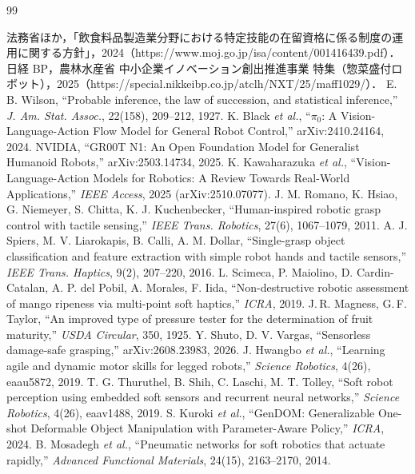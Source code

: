 \documentclass[a4paper,twocolumn,10pt]{ltjsarticle}
\begin{document}
\begin{thebibliography}{99}\raggedright\small
{} 法務省ほか，「飲食料品製造業分野における特定技能の在留資格に係る制度の運用に関する方針」，2024（https://www.moj.go.jp/isa/content/001416439.pdf）．
 日経 BP，農林水産省 中小企業イノベーション創出推進事業 特集（惣菜盛付ロボット），2025（https://special.nikkeibp.co.jp/atclh/NXT/25/maff1029/）．
 E. B. Wilson, ``Probable inference, the law of succession, and statistical inference,'' \textit{J. Am. Stat. Assoc.}, 22(158), 209--212, 1927.
 K. Black \textit{et al.}, ``$\pi_0$: A Vision-Language-Action Flow Model for General Robot Control,'' arXiv:2410.24164, 2024.
 NVIDIA, ``GR00T N1: An Open Foundation Model for Generalist Humanoid Robots,'' arXiv:2503.14734, 2025.
 K. Kawaharazuka \textit{et al.}, ``Vision-Language-Action Models for Robotics: A Review Towards Real-World Applications,'' \textit{IEEE Access}, 2025 (arXiv:2510.07077).
 J. M. Romano, K. Hsiao, G. Niemeyer, S. Chitta, K. J. Kuchenbecker, ``Human-inspired robotic grasp control with tactile sensing,'' \textit{IEEE Trans. Robotics}, 27(6), 1067--1079, 2011.
 A. J. Spiers, M. V. Liarokapis, B. Calli, A. M. Dollar, ``Single-grasp object classification and feature extraction with simple robot hands and tactile sensors,'' \textit{IEEE Trans. Haptics}, 9(2), 207--220, 2016.
 L. Scimeca, P. Maiolino, D. Cardin-Catalan, A. P. del Pobil, A. Morales, F. Iida, ``Non-destructive robotic assessment of mango ripeness via multi-point soft haptics,'' \textit{ICRA}, 2019.
 J.\,R. Magness, G.\,F. Taylor, ``An improved type of pressure tester for the determination of fruit maturity,'' \emph{USDA Circular}, 350, 1925.
 Y. Shuto, D. V. Vargas, ``Sensorless damage-safe grasping,'' arXiv:2608.23983, 2026.
 J. Hwangbo \textit{et al.}, ``Learning agile and dynamic motor skills for legged robots,'' \textit{Science Robotics}, 4(26), eaau5872, 2019.
 T. G. Thuruthel, B. Shih, C. Laschi, M. T. Tolley, ``Soft robot perception using embedded soft sensors and recurrent neural networks,'' \textit{Science Robotics}, 4(26), eaav1488, 2019.
 S. Kuroki \textit{et al.}, ``GenDOM: Generalizable One-shot Deformable Object Manipulation with Parameter-Aware Policy,'' \textit{ICRA}, 2024.
 B. Mosadegh \emph{et al.}, ``Pneumatic networks for soft robotics that actuate rapidly,'' \emph{Advanced Functional Materials}, 24(15), 2163--2170, 2014.

\end{thebibliography}
\end{document}
